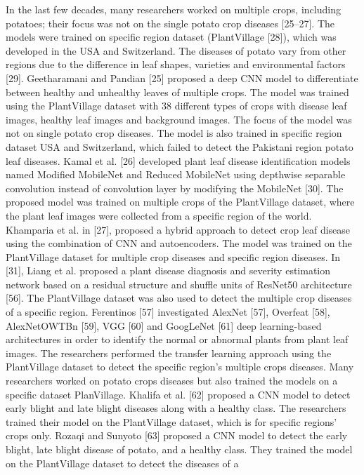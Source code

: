 \documentclass[11pt]{report}
\begin{document}
In the last few decades, many researchers worked on multiple crops, including potatoes; their focus was not on the single potato crop diseases [25–27]. The models were
trained on specific region dataset (PlantVillage [28]), which was developed in the USA and
Switzerland. The diseases of potato vary from other regions due to the difference in leaf
shapes, varieties and environmental factors [29]. Geetharamani and Pandian [25] proposed
a deep CNN model to differentiate between healthy and unhealthy leaves of multiple
crops. The model was trained using the PlantVillage dataset with 38 different types of
crops with disease leaf images, healthy leaf images and background images. The focus
of the model was not on single potato crop diseases. The model is also trained in specific
region dataset USA and Switzerland, which failed to detect the Pakistani region potato
leaf diseases. Kamal et al. [26] developed plant leaf disease identification models named
Modified MobileNet and Reduced MobileNet using depthwise separable convolution
instead of convolution layer by modifying the MobileNet [30]. The proposed model was
trained on multiple crops of the PlantVillage dataset, where the plant leaf images were
collected from a specific region of the world. Khamparia et al. in [27], proposed a hybrid
approach to detect crop leaf disease using the combination of CNN and autoencoders. The model was trained on the PlantVillage dataset for multiple crop diseases and specific region
diseases. In [31], Liang et al. proposed a plant disease diagnosis and severity estimation
network based on a residual structure and shuffle units of ResNet50 architecture [56].
The PlantVillage dataset was also used to detect the multiple crop diseases of a specific
region. Ferentinos [57] investigated AlexNet [57], Overfeat [58], AlexNetOWTBn [59],
VGG [60] and GoogLeNet [61] deep learning-based architectures in order to identify the
normal or abnormal plants from plant leaf images. The researchers performed the transfer
learning approach using the PlantVillage dataset to detect the specific region’s multiple
crops diseases.
Many researchers worked on potato crops diseases but also trained the models on a
specific dataset PlanVillage. Khalifa et al. [62] proposed a CNN model to detect early blight
and late blight diseases along with a healthy class. The researchers trained their model on
the PlantVillage dataset, which is for specific regions’ crops only. Rozaqi and Sunyoto [63]
proposed a CNN model to detect the early blight, late blight disease of potato, and a
healthy class. They trained the model on the PlantVillage dataset to detect the diseases of a
\end{document}
